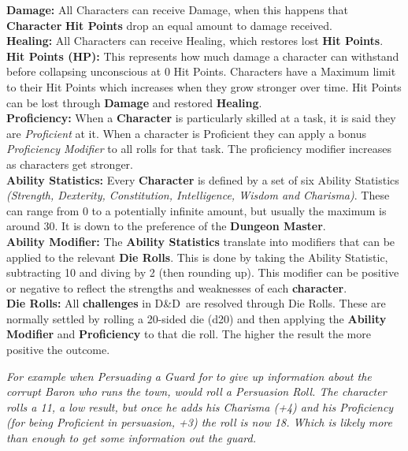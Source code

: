 \documentclass[progress]{cmpreport}
\newcommand{\dnd}{D\&D}
\begin{document}
	\textbf{Damage:} All Characters can receive Damage, when this happens that \textbf{Character} \textbf{Hit Points} drop an equal amount to damage received.\\
	
	\textbf{Healing:} All Characters can receive Healing, which restores lost \textbf{Hit Points}. \\
	
	\textbf{Hit Points (HP):} This represents how much damage a character can withstand before collapsing unconscious at 0 Hit Points. Characters have a Maximum limit to their Hit Points which increases when they grow stronger over time. Hit Points can be lost through \textbf{Damage} and restored \textbf{Healing}. \\
	
	\textbf{Proficiency:} When a \textbf{Character} is particularly skilled at a task, it is said they are \textit{Proficient} at it. When a character is Proficient they can apply a bonus \textit{Proficiency Modifier} to all rolls for that task. The proficiency modifier increases as characters get stronger. \\
	
	\textbf{Ability Statistics:} Every \textbf{Character} is defined by a set of six Ability Statistics \textit{(Strength, Dexterity, Constitution, Intelligence, Wisdom and Charisma)}. These can range from 0 to a potentially infinite amount, but usually the maximum is around 30. It is down to the preference of the \textbf{Dungeon Master}. \\
	
	\textbf{Ability Modifier:} The \textbf{Ability Statistics} translate into modifiers that can be applied to the relevant \textbf{Die Rolls}. This is done by taking the Ability Statistic, subtracting 10 and diving by 2 (then rounding up). This modifier can be positive or negative to reflect the strengths and weaknesses of each \textbf{character}. \\
	
	\textbf{Die Rolls:} All \textbf{challenges} in \dnd \ are resolved through Die Rolls. These are normally settled by rolling a 20-sided die (d20) and then applying the \textbf{Ability Modifier} and \textbf{Proficiency} to that die roll. The higher the result the more positive the outcome. 
	
	\textit{For example when Persuading a Guard for to give up information about the corrupt Baron who runs the town, would roll a Persuasion Roll. The character rolls a 11, a low result, but once he adds his Charisma (+4) and his Proficiency (for being Proficient in persuasion, +3) the roll is now 18. Which is likely more than enough to get some information out the guard.}
	
\end{document}

